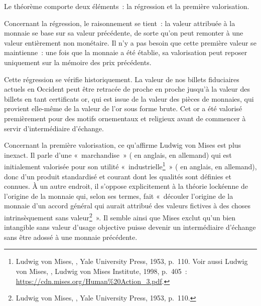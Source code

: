 Le théorème comporte deux éléments~: la régression et la première valorisation.


Concernant la régression, le raisonnement se tient~: la valeur attribuée à la monnaie se base sur sa valeur précédente, de sorte qu'on peut remonter à une valeur entièrement non monétaire. Il n'y a pas besoin que cette première valeur se maintienne~: une fois que la monnaie a été établie, sa valorisation peut reposer uniquement sur la mémoire des prix précédents. 

Cette régression se vérifie historiquement. La valeur de nos billets fiduciaires actuels en Occident peut être retracée de proche en proche jusqu'à la valeur des billets en tant certificats or, qui est issue de la valeur des pièces de monnaies, qui provient elle-même de la valeur de l'or sous forme brute. Cet or a été valorisé premièrement pour des motifs ornementaux et religieux avant de commencer à servir d'intermédiaire d'échange.


Concernant la première valorisation, ce qu'affirme Ludwig von Mises est plus inexact. Il parle d'une «~marchandise~» ( en anglais,  en allemand) qui est initialement valorisée pour son utilité «~industrielle\footnote{Ludwig von Mises, , Yale University Press, 1953, p.~110. Voir aussi Ludwig von Mises, , Ludwig von Mises Institute, 1998, p.~405~: \url{https://cdn.mises.org/Human\%20Action_3.pdf}.}~» ( en anglais,  en allemand), donc d'un produit standardisé et courant dont les qualités sont définies et connues. À un autre endroit, il s'oppose explicitement à la théorie lockéenne de l'origine de la monnaie qui, selon ses termes, fait «~découler l'origine de la monnaie d'un accord général qui aurait attribué des valeurs fictives à des choses intrinsèquement sans valeur\footnote{Ludwig von Mises, , Yale University Press, 1953, p.~110.}~». Il semble ainsi que Mises exclut qu'un bien intangible sans valeur d'usage objective puisse devenir un intermédiaire d'échange sans être adossé à une monnaie précédente. %


